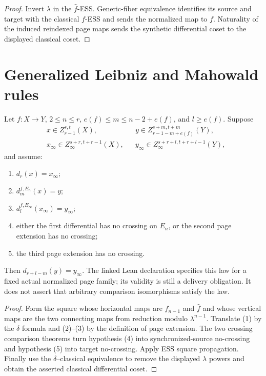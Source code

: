 \begin{proof}
  Invert $\lambda$ in the $\widehat f$-ESS.  Generic-fiber equivalence
  identifies its source and target with the classical $f$-ESS and sends the
  normalized map to $f$.  Naturality of the induced reindexed page maps sends
  the synthetic differential coset to the displayed classical coset.
\end{proof}

\section{Generalized Leibniz and Mahowald rules}

\begin{theorem}
  \label{thm:generalized-leibniz}
  \notready
  Let $f:X\to Y$, $2\le n\le r$,
  $e(f)\le m\le n-2+e(f)$, and $l\ge e(f)$.  Suppose
  \[
  \begin{aligned}
    &x\in Z_{r-1}^{s,t}(X),&&
    y\in Z_{r-1-m+e(f)}^{s+m,t+m}(Y),\\
    &x_\infty\in Z_\infty^{s+r,t+r-1}(X),&&
    y_\infty\in Z_\infty^{s+r+l,t+r+l-1}(Y),
  \end{aligned}
  \]
  and assume:
  \begin{enumerate}
    \item $d_r(x)=x_\infty$;
    \item $d_m^{f,E_n}(x)=y$;
    \item $d_l^{f,E_\infty}(x_\infty)=y_\infty$;
    \item either the first differential has no crossing on $E_n$, or the
      second page extension has no crossing;
    \item the third page extension has no crossing.
  \end{enumerate}
  Then $d_{r+l-m}(y)=y_\infty$.
  The linked Lean declaration specifies this law for a fixed actual
  normalized page family; its validity is still a delivery obligation.
  It does not assert that arbitrary comparison isomorphisms satisfy the law.
\end{theorem}

\begin{proof}
  Form the square whose horizontal maps are
  $\widehat f_{n-1}$ and $\widehat f$ and whose vertical maps are the two
  connecting maps from reduction modulo $\lambda^{n-1}$.  Translate (1) by the
  $\delta$ formula and (2)--(3) by the definition of page extension.  The two
  crossing comparison theorems turn hypothesis (4) into synchronized-source
  no-crossing and hypothesis (5) into target no-crossing.  Apply ESS square
  propagation.  Finally use the $\delta$--classical equivalence to remove the
  displayed $\lambda$ powers and obtain the asserted classical differential
  coset.
\end{proof}

